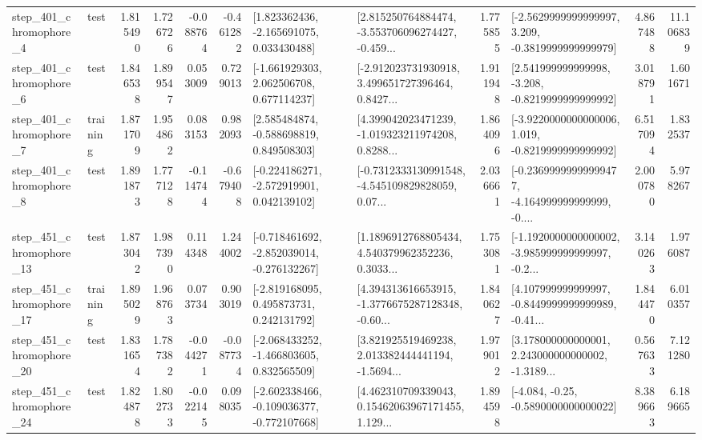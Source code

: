 \begin{tabular}{llrrrrllrlrr}
   step\_401\_chromophore\_4 &      test &      1.815490 &    1.726726 &     -0.088764 & -0.461282 &    [1.823362436, -2.165691075, 0.033430488] &  [2.815250764884474, -3.553706096274427, -0.459... &       1.775855 &  [-2.5629999999999997, 3.209, -0.3819999999999979] &            4.867488 &         11.106839 \\
   step\_401\_chromophore\_6 &      test &      1.846538 &    1.899547 &      0.053009 &  0.729013 &    [-1.661929303, 2.062506708, 0.677114237] &  [-2.912023731930918, 3.499651727396464, 0.8427... &       1.911948 &   [2.541999999999998, -3.208, -0.8219999999999992] &            3.018791 &          1.601671 \\
   step\_401\_chromophore\_7 &  training &      1.871709 &    1.954862 &      0.083153 &  0.982093 &    [2.585484874, -0.588698819, 0.849508303] &  [4.399042023471239, -1.019323211974208, 0.8288... &       1.864096 &  [-3.9220000000000006, 1.019, -0.8219999999999992] &            6.517094 &          1.832537 \\
   step\_401\_chromophore\_8 &      test &      1.891873 &    1.777128 &     -0.114744 & -0.679408 &   [-0.224186271, -2.572919901, 0.042139102] &  [-0.7312333130991548, -4.545109829828059, 0.07... &       2.036661 &  [-0.23699999999999477, -4.164999999999999, -0.... &            2.000780 &          5.978267 \\
  step\_451\_chromophore\_13 &      test &      1.873042 &    1.987390 &      0.114348 &  1.244002 &  [-0.718461692, -2.852039014, -0.276132267] &  [1.1896912768805434, 4.540379962352236, 0.3033... &       1.753081 &  [-1.1920000000000002, -3.985999999999997, -0.2... &            3.140263 &          1.976087 \\
  step\_451\_chromophore\_17 &  training &      1.895029 &    1.968763 &      0.073734 &  0.903019 &    [-2.819168095, 0.495873731, 0.242131792] &  [4.394313616653915, -1.3776675287128348, -0.60... &       1.840627 &  [4.107999999999997, -0.8449999999999989, -0.41... &            1.844470 &          6.010357 \\
  step\_451\_chromophore\_20 &      test &      1.831654 &    1.787382 &     -0.044271 & -0.087734 &   [-2.068433252, -1.466803605, 0.832565509] &  [3.821925519469238, 2.013382444441194, -1.5694... &       1.979012 &  [3.178000000000001, 2.243000000000002, -1.3189... &            0.567633 &          7.121280 \\
  step\_451\_chromophore\_24 &      test &      1.824878 &    1.802733 &     -0.022145 &  0.098035 &  [-2.602338466, -0.109036377, -0.772107668] &  [4.462310709339043, 0.15462063967171455, 1.129... &       1.894598 &               [-4.084, -0.25, -0.5890000000000022] &            8.389663 &          6.189665 \\

\end{tabular}
